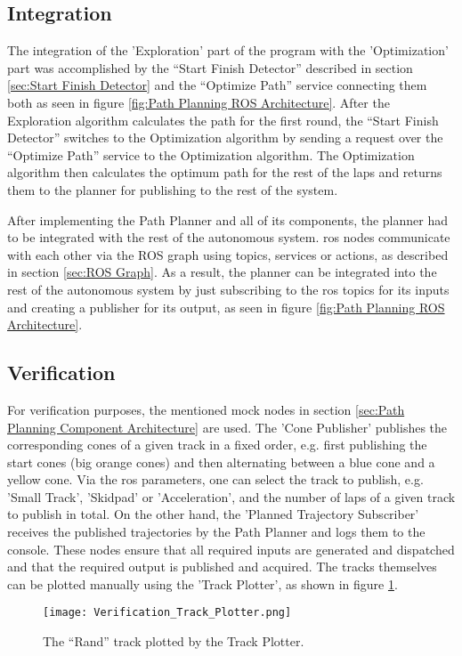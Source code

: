 \subsection{Integration} \label{sec:Integration}
The integration of the 'Exploration' part of the program with the 'Optimization' part was accomplished by the ``Start Finish Detector'' described in section \ref{sec:Start Finish Detector} and the ``Optimize Path'' service connecting them both as seen in figure \ref{fig:Path Planning ROS Architecture}. After the Exploration algorithm calculates the path for the first round, the ``Start Finish Detector'' switches to the Optimization algorithm by sending a request over the ``Optimize Path'' service to the Optimization algorithm. The Optimization algorithm then calculates the optimum path for the rest of the laps and returns them to the planner for publishing to the rest of the system.

After implementing the Path Planner and all of its components, the planner had to be integrated with the rest of the autonomous system.
\acrshort{ros} nodes communicate with each other via the ROS graph using topics, services or actions, as described in section \ref{sec:ROS Graph}. As a result, the planner can be integrated into the rest of the autonomous system by just subscribing to the \acrshort{ros} topics for its inputs and creating a publisher for its output, as seen in figure \ref{fig:Path Planning ROS Architecture}.

\subsection{Verification} \label{sec:Verification}
For verification purposes, the mentioned mock nodes in section \ref{sec:Path Planning Component Architecture} are used. The 'Cone Publisher' publishes the corresponding cones of a given track in a fixed order, e.g. first publishing the start cones (big orange cones) and then alternating between a blue cone and a yellow cone. Via the \acrshort{ros} parameters, one can select the track to publish, e.g. 'Small Track', 'Skidpad' or 'Acceleration', and the number of laps of a given track to publish in total. On the other hand, the 'Planned Trajectory Subscriber' receives the published trajectories by the Path Planner and logs them to the console. These nodes ensure that all required inputs are generated and dispatched and that the required output is published and acquired. The tracks themselves can be plotted manually using the 'Track Plotter', as shown in figure \ref{fig:Verification Track Plotter}.
\begin{figure}[H]
    \centering
    \texttt{[image: Verification\_Track\_Plotter.png]}
    \caption{The ``Rand'' track plotted by the Track Plotter.}
    \label{fig:Verification Track Plotter}
\end{figure}

